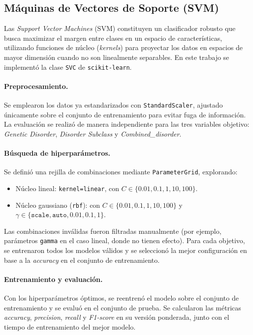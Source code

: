 \documentclass[11pt,a4paper,spanish]{book}
\numberwithin{equation}{chapter}
\numberwithin{figure}{chapter}
\begin{document}
\subsection{Máquinas de Vectores de Soporte (SVM)}
\label{subsec:svm}

Las \textit{Support Vector Machines} (SVM) constituyen un clasificador robusto que busca maximizar
el margen entre clases en un espacio de características, utilizando funciones de núcleo
(\textit{kernels}) para proyectar los datos en espacios de mayor dimensión cuando no son linealmente separables.
En este trabajo se implementó la clase \texttt{SVC} de \texttt{scikit-learn}.

\paragraph{Preprocesamiento.}
Se emplearon los datos ya estandarizados con \texttt{StandardScaler}, ajustado únicamente sobre el conjunto
de entrenamiento para evitar fuga de información. La evaluación se realizó de manera independiente
para las tres variables objetivo: \textit{Genetic Disorder}, \textit{Disorder Subclass} y \textit{Combined\_disorder}.

\paragraph{Búsqueda de hiperparámetros.}
Se definió una rejilla de combinaciones mediante \texttt{ParameterGrid}, explorando:
\begin{itemize}
  \item Núcleo lineal: \texttt{kernel=linear}, con $C \in \{0.01, 0.1, 1, 10, 100\}$.
  \item Núcleo gaussiano (\texttt{rbf}): con $C \in \{0.01, 0.1, 1, 10, 100\}$ y $\gamma \in \{\texttt{scale}, \texttt{auto}, 0.01, 0.1, 1\}$.
\end{itemize}
Las combinaciones inválidas fueron filtradas manualmente (por ejemplo, parámetros \texttt{gamma} en
el caso lineal, donde no tienen efecto). Para cada objetivo, se entrenaron todos los modelos válidos y se
seleccionó la mejor configuración en base a la \textit{accuracy} en el conjunto de entrenamiento.

\paragraph{Entrenamiento y evaluación.}
Con los hiperparámetros óptimos, se reentrenó el modelo sobre el conjunto de entrenamiento
y se evaluó en el conjunto de prueba. Se calcularon las métricas \textit{accuracy}, \textit{precision},
\textit{recall} y \textit{F1-score} en su versión ponderada, junto con el tiempo de entrenamiento
del mejor modelo.
\end{document}

